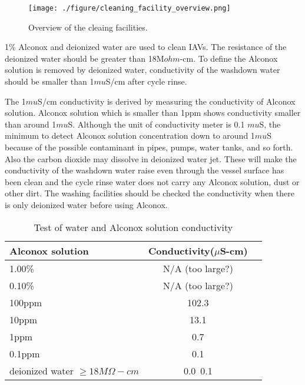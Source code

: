 



\begin{figure}
    \centering
    \texttt{[image: ./figure/cleaning\_facility\_overview.png]}
    \caption{Overview of the cleaing facilities.}
    \label{cleaning_facility_overview.png}
    \end{figure}

1\% Alconox and deionized water are used to clean IAVs.
The resistance of the deionized water should be greater than 18M$ohm$-cm.
To define the Alconox solution is removed by deionized water, conductivity of the
washdown water should be smaller than 1$mu$S/cm after cycle rinse.



The 1$mu$S/cm conductivity is derived by measuring the conductivity of Alconox solution.
Alconox solution which is smaller than 1ppm shows conductivity smaller than around 1$mu$S.
Although the unit of conductivity meter
is 0.1 $mu$S, the minimum to detect
Alconox solution concentration down to around 1$mu$S because of the possible contaminant
in pipes, pumps, water tanks, and so forth. Also the carbon dioxide may dissolve in
deionized water jet. These will make the conductivity of the washdown water raise
even through the vessel surface has been clean and the cycle rinse water does not
carry any Alconox solution, dust or other dirt. The washing facilities should be checked
the conductivity when there is only deionized water before using Alconox.


\begin{table}
\centering
\caption{Test of water and Alconox solution conductivity}
\label{tab:AlconoxConductivity}
\begin{tabular}{lcp{5.0cm}}
Alconox solution &   Conductivity($\mu$S-cm) \\
\hline
\hline
1.00\% &  N/A (too large?)\\
\hline
0.10\% &  N/A (too large?)\\
\hline
100ppm & 102.3\\
\hline
10ppm  & 13.1\\
\hline
1ppm   & 0.7\\
\hline
0.1ppm & 0.1\\
\hline
deionized water $\geq 18M\Omega-cm$ &0.0~0.1\\
\end{tabular}
\end{table}



